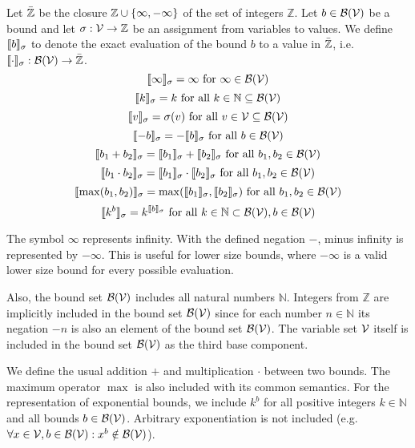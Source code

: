 \begin{definition}
  Let $\bar{\mathbb{Z}}$ be the closure $\mathbb{Z} \cup \lbrace \infty, -\infty \rbrace$ of the set of integers $\mathbb{Z}$.
  Let $b \in \mathcal{B}(\mathcal{V})$ be a bound and let $\sigma: \mathcal{V} \rightarrow \mathbb{Z}$ be an assignment from variables to values.
  We define $\llbracket b \rrbracket_{\sigma}$ to denote the exact evaluation of the bound $b$ to a value in $\bar{\mathbb{Z}}$, i.e. $\llbracket \cdot \rrbracket_{\sigma}: \mathcal{B}(\mathcal{V}) \rightarrow \bar{\mathbb{Z}}$.
  \[ \llbracket \infty \rrbracket_{\sigma} = \infty \text{ for } \infty \in \mathcal{B}(\mathcal{V}) \]
  \[ \llbracket k \rrbracket_{\sigma} = k \text{ for all } k \in \mathbb{N} \subseteq \mathcal{B}(\mathcal{V}) \] 
  \[ \llbracket v \rrbracket_{\sigma} = \sigma(v) \text{ for all } v \in \mathcal{V} \subseteq \mathcal{B}(\mathcal{V}) \] 
  \[ \llbracket -b \rrbracket_{\sigma} = -\llbracket b \rrbracket_{\sigma} \text{ for all } b \in \mathcal{B}(\mathcal{V}) \] 
  \[ \llbracket b_1 + b_2 \rrbracket_{\sigma} = \llbracket b_1 \rrbracket_{\sigma} + \llbracket b_2 \rrbracket_{\sigma} \text{ for all } b_1, b_2 \in \mathcal{B}(\mathcal{V}) \] 
  \[ \llbracket b_1 \cdot b_2 \rrbracket_{\sigma} = \llbracket b_1 \rrbracket_{\sigma} \cdot \llbracket b_2 \rrbracket_{\sigma} \text{ for all } b_1, b_2 \in \mathcal{B}(\mathcal{V}) \] 
  \[ \llbracket \max(b_1, b_2) \rrbracket_{\sigma} = \max(\llbracket b_1 \rrbracket_{\sigma}, \llbracket b_2 \rrbracket_{\sigma}) \text{ for all } b_1, b_2 \in \mathcal{B}(\mathcal{V}) \]
  \[ \llbracket k^b \rrbracket_{\sigma} = k^{\llbracket b \rrbracket_{\sigma}} \text{ for all } k \in \mathbb{N} \subset \mathcal{B}(\mathcal{V}), b \in \mathcal{B}(\mathcal{V}) \]  
\end{definition}
The symbol $\infty$ represents infinity.
With the defined negation $-$, minus infinity is represented by $-\infty$.
This is useful for lower size bounds, where $-\infty$ is a valid lower size bound for every possible evaluation.

Also, the bound set $\mathcal{B}(\mathcal{V})$ includes all natural numbers $\mathbb{N}$.
Integers from $\mathbb{Z}$ are implicitly included in the bound set $\mathcal{B}(\mathcal{V})$ since for each number $n \in \mathbb{N}$ its negation $-n$ is also an element of the bound set $\mathcal{B}(\mathcal{V})$.
The variable set $\mathcal{V}$ itself is included in the bound set $\mathcal{B}(\mathcal{V})$ as the third base component.

We define the usual addition $+$ and multiplication $\cdot$ between two bounds.
The maximum operator $\max$ is also included with its common semantics.
For the representation of exponential bounds, we include $k^b$ for all positive integers $k \in \mathbb{N}$ and all bounds $b \in \mathcal{B}(\mathcal{V})$.
Arbitrary exponentiation is not included (e.g. $\forall x \in \mathcal{V}, b \in \mathcal{B}(\mathcal{V}): x^b \notin \mathcal{B}(\mathcal{V})$).

